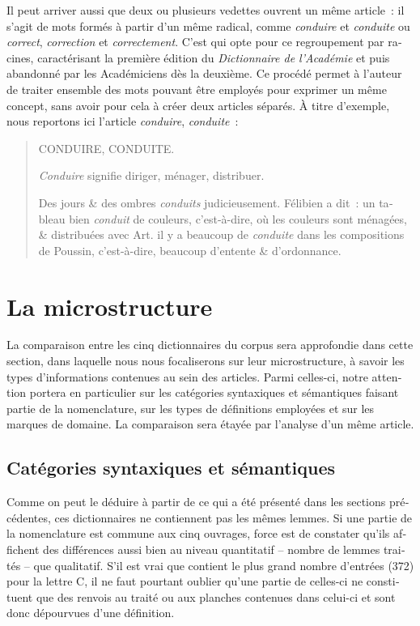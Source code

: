 \documentclass[output=paper,colorlinks,citecolor=brown,arabicfont,chinesefont,booklanguage=french]{langscibook}
\begin{document}
\begin{otherlanguage}{french}
Il peut arriver aussi que deux ou plusieurs vedettes ouvrent un même article~: il s’agit de mots formés à partir d’un même radical, comme \emph{conduire} et \emph{conduite} ou \emph{correct}, \emph{correction} et \emph{correctement}. C’est \citet{Marsy1746} qui opte pour ce regroupement par racines, caractérisant la première édition du \emph{Dictionnaire de l’Académie} \citep{AcadFr1694} et puis abandonné par les Académiciens dès la deuxième. Ce procédé permet à l’auteur de traiter ensemble des mots pouvant être employés pour exprimer un même concept, sans avoir pour cela à créer deux articles séparés. À titre d’exemple, nous reportons ici l’article \emph{conduire}, \emph{conduite}~:

\begin{quote}
    CONDUIRE, CONDUITE. 
    
    \emph{Conduire} signifie diriger, ménager, distribuer. 
    
    Des jours \& des ombres \emph{conduits} judicieusement. Félibien a dit~: un tableau bien \emph{conduit} de couleurs, c’est-à-dire, où les couleurs sont ménagées, \& distribuées avec Art. il y a beaucoup de \emph{conduite} dans les compositions de Poussin, c’est-à-dire, beaucoup d’entente \& d’ordonnance. 
\end{quote}

\section{La microstructure}

La comparaison entre les cinq dictionnaires du corpus sera approfondie dans cette section, dans laquelle nous nous focaliserons sur leur microstructure, à savoir les types d’informations contenues au sein des articles. Parmi celles-ci, notre attention portera en particulier sur les catégories syntaxiques et sémantiques faisant partie de la nomenclature, sur les types de définitions employées et sur les marques de domaine. La comparaison sera étayée par l’analyse d’un même article. 

\subsection{Catégories syntaxiques et sémantiques}

Comme on peut le déduire à partir de ce qui a été présenté dans les sections précédentes, ces dictionnaires ne contiennent pas les mêmes lemmes. Si une partie de la nomenclature est commune aux cinq ouvrages, force est de constater qu’ils affichent des différences aussi bien au niveau quantitatif – nombre de lemmes traités – que qualitatif. S’il est vrai que \citet{Felibien1676} contient le plus grand nombre d’entrées (372) pour la lettre C, il ne faut pourtant oublier qu’une partie de celles-ci ne constituent que des renvois au traité ou aux planches contenues dans celui-ci et sont donc dépourvues d’une définition.


\end{otherlanguage}
\end{document}
